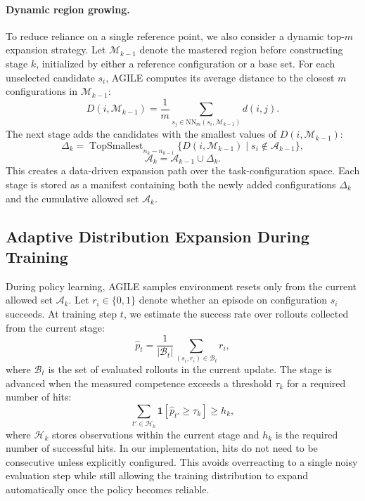 \paragraph{Dynamic region growing.}
To reduce reliance on a single reference point, we also consider a dynamic
top-$m$ expansion strategy. Let $\mathcal{M}_{k-1}$ denote the mastered region
before constructing stage $k$, initialized by either a reference configuration
or a base set. For each unselected candidate $s_i$, AGILE computes its average
distance to the closest $m$ configurations in $\mathcal{M}_{k-1}$:
\begin{equation}
    D(i, \mathcal{M}_{k-1}) =
    \frac{1}{m}
    \sum_{s_j \in \mathrm{NN}_m(s_i, \mathcal{M}_{k-1})} d(i,j).
\end{equation}
The next stage adds the candidates with the smallest values of
$D(i, \mathcal{M}_{k-1})$:
\begin{equation}
    \Delta_k =
    \operatorname{TopSmallest}_{n_k - n_{k-1}}
    \{D(i, \mathcal{M}_{k-1}) \mid s_i \notin \mathcal{A}_{k-1}\},
\end{equation}
\begin{equation}
    \mathcal{A}_k = \mathcal{A}_{k-1} \cup \Delta_k.
\end{equation}
This creates a data-driven expansion path over the task-configuration space.
Each stage is stored as a manifest containing both the newly added
configurations $\Delta_k$ and the cumulative allowed set $\mathcal{A}_k$.

\subsection{Adaptive Distribution Expansion During Training}
\label{subsec:adaptive_expansion}

During policy learning, AGILE samples environment resets only from the current
allowed set $\mathcal{A}_k$. Let $r_i \in \{0,1\}$ denote whether an episode on
configuration $s_i$ succeeds. At training step $t$, we estimate the success rate
over rollouts collected from the current stage:
\begin{equation}
    \hat{p}_t =
    \frac{1}{|\mathcal{B}_t|}
    \sum_{(s_i,r_i)\in\mathcal{B}_t} r_i,
\end{equation}
where $\mathcal{B}_t$ is the set of evaluated rollouts in the current update.
The stage is advanced when the measured competence exceeds a threshold
$\tau_k$ for a required number of hits:
\begin{equation}
    \sum_{t' \in \mathcal{H}_k}
    \mathbf{1}[\hat{p}_{t'} \geq \tau_k]
    \geq h_k,
\end{equation}
where $\mathcal{H}_k$ stores observations within the current stage and $h_k$ is
the required number of successful hits. In our implementation, hits do not need
to be consecutive unless explicitly configured. This avoids overreacting to a
single noisy evaluation step while still allowing the training distribution to
expand automatically once the policy becomes reliable.

